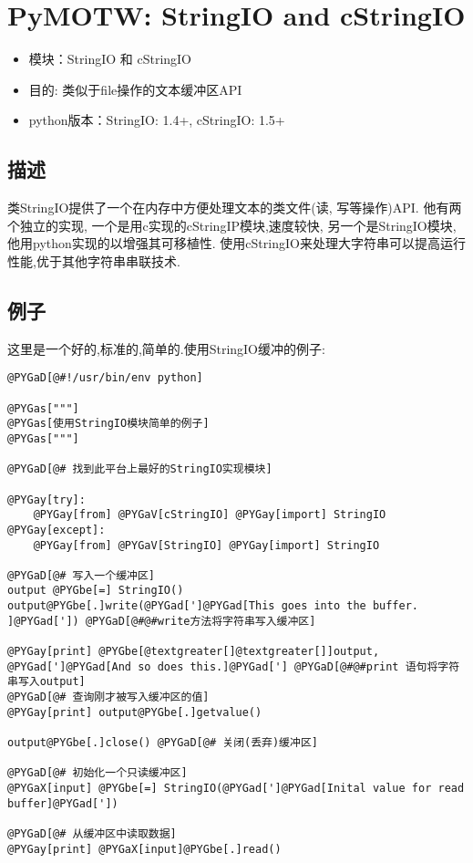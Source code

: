 \documentclass[a4paper,10pt,english]{manual}
\begin{document}
\clearpage
\section{PyMOTW: StringIO and cStringIO}
\begin{itemize}
\item {} 
模块：StringIO 和 cStringIO

\item {} 
目的: 类似于file操作的文本缓冲区API

\item {} 
python版本：StringIO: 1.4+, cStringIO: 1.5+

\end{itemize}


\subsection{描述}

类StringIO提供了一个在内存中方便处理文本的类文件(读, 写等操作)API. 他有两个独立的实现, 一个是用c实现的cStringIP模块,速度较快, 另一个是StringIO模块,他用python实现的以增强其可移植性. 使用cStringIO来处理大字符串可以提高运行性能,优于其他字符串串联技术.


\subsection{例子}

这里是一个好的,标准的,简单的.使用StringIO缓冲的例子:

\begin{Verbatim}[commandchars=@\[\]]
@PYGaD[@#!/usr/bin/env python]

@PYGas["""]
@PYGas[使用StringIO模块简单的例子]
@PYGas["""]

@PYGaD[@# 找到此平台上最好的StringIO实现模块]

@PYGay[try]:
    @PYGay[from] @PYGaV[cStringIO] @PYGay[import] StringIO
@PYGay[except]:
    @PYGay[from] @PYGaV[StringIO] @PYGay[import] StringIO

@PYGaD[@# 写入一个缓冲区]
output @PYGbe[=] StringIO()
output@PYGbe[.]write(@PYGad[']@PYGad[This goes into the buffer. ]@PYGad[']) @PYGaD[@#@#write方法将字符串写入缓冲区]

@PYGay[print] @PYGbe[@textgreater[]@textgreater[]]output, @PYGad[']@PYGad[And so does this.]@PYGad['] @PYGaD[@#@#print 语句将字符串写入output]
@PYGaD[@# 查询刚才被写入缓冲区的值]
@PYGay[print] output@PYGbe[.]getvalue()

output@PYGbe[.]close() @PYGaD[@# 关闭(丢弃)缓冲区]

@PYGaD[@# 初始化一个只读缓冲区]
@PYGaX[input] @PYGbe[=] StringIO(@PYGad[']@PYGad[Inital value for read buffer]@PYGad['])

@PYGaD[@# 从缓冲区中读取数据]
@PYGay[print] @PYGaX[input]@PYGbe[.]read()
\end{Verbatim}
\end{document}
